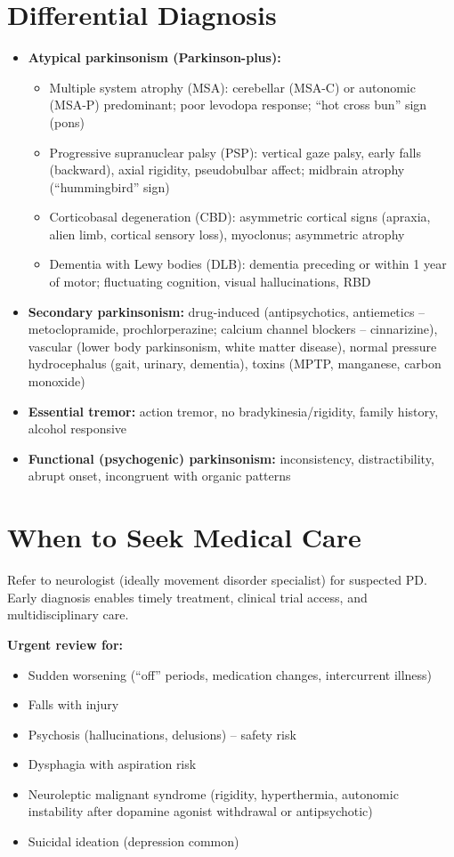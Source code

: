 \section*{Differential Diagnosis}
\begin{itemize}
    \item \textbf{Atypical parkinsonism (Parkinson-plus):}
    \begin{itemize}
        \item Multiple system atrophy (MSA): cerebellar (MSA-C) or autonomic (MSA-P) predominant; poor levodopa response; ``hot cross bun'' sign (pons)
        \item Progressive supranuclear palsy (PSP): vertical gaze palsy, early falls (backward), axial rigidity, pseudobulbar affect; midbrain atrophy (``hummingbird'' sign)
        \item Corticobasal degeneration (CBD): asymmetric cortical signs (apraxia, alien limb, cortical sensory loss), myoclonus; asymmetric atrophy
        \item Dementia with Lewy bodies (DLB): dementia preceding or within 1 year of motor; fluctuating cognition, visual hallucinations, RBD
    \end{itemize}
    \item \textbf{Secondary parkinsonism:} drug-induced (antipsychotics, antiemetics -- metoclopramide, prochlorperazine; calcium channel blockers -- cinnarizine), vascular (lower body parkinsonism, white matter disease), normal pressure hydrocephalus (gait, urinary, dementia), toxins (MPTP, manganese, carbon monoxide)
    \item \textbf{Essential tremor:} action tremor, no bradykinesia/rigidity, family history, alcohol responsive
    \item \textbf{Functional (psychogenic) parkinsonism:} inconsistency, distractibility, abrupt onset, incongruent with organic patterns
\end{itemize}

\section*{When to Seek Medical Care}
Refer to neurologist (ideally movement disorder specialist) for suspected PD. Early diagnosis enables timely treatment, clinical trial access, and multidisciplinary care.

\textbf{Urgent review for:}
\begin{itemize}
    \item Sudden worsening (``off'' periods, medication changes, intercurrent illness)
    \item Falls with injury
    \item Psychosis (hallucinations, delusions) -- safety risk
    \item Dysphagia with aspiration risk
    \item Neuroleptic malignant syndrome (rigidity, hyperthermia, autonomic instability after dopamine agonist withdrawal or antipsychotic)
    \item Suicidal ideation (depression common)
\end{itemize}

